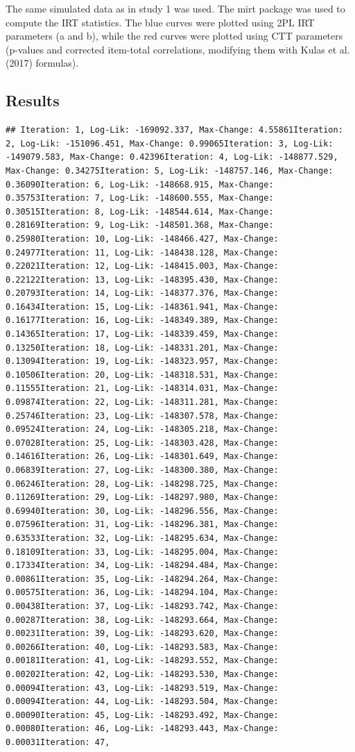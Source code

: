 \documentclass[
  english,
  man,floatsintext]{apa6}
\begin{document}
The same simulated data as in study 1 was used. The mirt package was used to compute the IRT statistics. The blue curves were plotted using 2PL IRT parameters (a and b), while the red curves were plotted using CTT parameters (p-values and corrected item-total correlations, modifying them with Kulas et al. (2017) formulas).

\hypertarget{results-1}{%
\subsection{Results}\label{results-1}}

\begin{verbatim}
## Iteration: 1, Log-Lik: -169092.337, Max-Change: 4.55861Iteration: 2, Log-Lik: -151096.451, Max-Change: 0.99065Iteration: 3, Log-Lik: -149079.583, Max-Change: 0.42396Iteration: 4, Log-Lik: -148877.529, Max-Change: 0.34275Iteration: 5, Log-Lik: -148757.146, Max-Change: 0.36090Iteration: 6, Log-Lik: -148668.915, Max-Change: 0.35753Iteration: 7, Log-Lik: -148600.555, Max-Change: 0.30515Iteration: 8, Log-Lik: -148544.614, Max-Change: 0.28169Iteration: 9, Log-Lik: -148501.368, Max-Change: 0.25980Iteration: 10, Log-Lik: -148466.427, Max-Change: 0.24977Iteration: 11, Log-Lik: -148438.128, Max-Change: 0.22021Iteration: 12, Log-Lik: -148415.003, Max-Change: 0.22122Iteration: 13, Log-Lik: -148395.430, Max-Change: 0.20793Iteration: 14, Log-Lik: -148377.376, Max-Change: 0.16434Iteration: 15, Log-Lik: -148361.941, Max-Change: 0.16177Iteration: 16, Log-Lik: -148349.389, Max-Change: 0.14365Iteration: 17, Log-Lik: -148339.459, Max-Change: 0.13250Iteration: 18, Log-Lik: -148331.201, Max-Change: 0.13094Iteration: 19, Log-Lik: -148323.957, Max-Change: 0.10506Iteration: 20, Log-Lik: -148318.531, Max-Change: 0.11555Iteration: 21, Log-Lik: -148314.031, Max-Change: 0.09874Iteration: 22, Log-Lik: -148311.281, Max-Change: 0.25746Iteration: 23, Log-Lik: -148307.578, Max-Change: 0.09524Iteration: 24, Log-Lik: -148305.218, Max-Change: 0.07028Iteration: 25, Log-Lik: -148303.428, Max-Change: 0.14616Iteration: 26, Log-Lik: -148301.649, Max-Change: 0.06839Iteration: 27, Log-Lik: -148300.380, Max-Change: 0.06246Iteration: 28, Log-Lik: -148298.725, Max-Change: 0.11269Iteration: 29, Log-Lik: -148297.980, Max-Change: 0.69940Iteration: 30, Log-Lik: -148296.556, Max-Change: 0.07596Iteration: 31, Log-Lik: -148296.381, Max-Change: 0.63533Iteration: 32, Log-Lik: -148295.634, Max-Change: 0.18109Iteration: 33, Log-Lik: -148295.004, Max-Change: 0.17334Iteration: 34, Log-Lik: -148294.484, Max-Change: 0.00861Iteration: 35, Log-Lik: -148294.264, Max-Change: 0.00575Iteration: 36, Log-Lik: -148294.104, Max-Change: 0.00438Iteration: 37, Log-Lik: -148293.742, Max-Change: 0.00287Iteration: 38, Log-Lik: -148293.664, Max-Change: 0.00231Iteration: 39, Log-Lik: -148293.620, Max-Change: 0.00266Iteration: 40, Log-Lik: -148293.583, Max-Change: 0.00181Iteration: 41, Log-Lik: -148293.552, Max-Change: 0.00202Iteration: 42, Log-Lik: -148293.530, Max-Change: 0.00094Iteration: 43, Log-Lik: -148293.519, Max-Change: 0.00094Iteration: 44, Log-Lik: -148293.504, Max-Change: 0.00090Iteration: 45, Log-Lik: -148293.492, Max-Change: 0.00080Iteration: 46, Log-Lik: -148293.443, Max-Change: 0.00031Iteration: 47, 
\end{verbatim}
\end{document}
